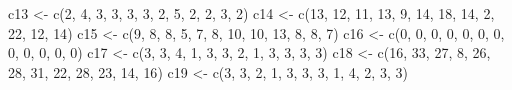 \documentclass[
]{book}
\newenvironment{Shaded}{\begin{snugshade}}{\end{snugshade}}
\newcommand{\DecValTok}[1]{\textcolor[rgb]{0.00,0.00,0.81}{#1}}
\newcommand{\FunctionTok}[1]{\textcolor[rgb]{0.00,0.00,0.00}{#1}}
\newcommand{\NormalTok}[1]{#1}
\newcommand{\OtherTok}[1]{\textcolor[rgb]{0.56,0.35,0.01}{#1}}
\begin{document}
\begin{Shaded}
\begin{Highlighting}[]
\NormalTok{c13 }\OtherTok{\textless{}{-}} \FunctionTok{c}\NormalTok{(}\DecValTok{2}\NormalTok{, }\DecValTok{4}\NormalTok{, }\DecValTok{3}\NormalTok{, }\DecValTok{3}\NormalTok{, }\DecValTok{3}\NormalTok{, }\DecValTok{3}\NormalTok{, }\DecValTok{2}\NormalTok{, }\DecValTok{5}\NormalTok{, }\DecValTok{2}\NormalTok{, }\DecValTok{2}\NormalTok{, }\DecValTok{3}\NormalTok{, }\DecValTok{2}\NormalTok{)}
\NormalTok{c14 }\OtherTok{\textless{}{-}} \FunctionTok{c}\NormalTok{(}\DecValTok{13}\NormalTok{, }\DecValTok{12}\NormalTok{, }\DecValTok{11}\NormalTok{, }\DecValTok{13}\NormalTok{, }\DecValTok{9}\NormalTok{, }\DecValTok{14}\NormalTok{, }\DecValTok{18}\NormalTok{, }\DecValTok{14}\NormalTok{, }\DecValTok{2}\NormalTok{, }\DecValTok{22}\NormalTok{, }\DecValTok{12}\NormalTok{, }\DecValTok{14}\NormalTok{)}
\NormalTok{c15 }\OtherTok{\textless{}{-}} \FunctionTok{c}\NormalTok{(}\DecValTok{9}\NormalTok{, }\DecValTok{8}\NormalTok{, }\DecValTok{8}\NormalTok{, }\DecValTok{5}\NormalTok{, }\DecValTok{7}\NormalTok{, }\DecValTok{8}\NormalTok{, }\DecValTok{10}\NormalTok{, }\DecValTok{10}\NormalTok{, }\DecValTok{13}\NormalTok{, }\DecValTok{8}\NormalTok{, }\DecValTok{8}\NormalTok{, }\DecValTok{7}\NormalTok{)}
\NormalTok{c16 }\OtherTok{\textless{}{-}} \FunctionTok{c}\NormalTok{(}\DecValTok{0}\NormalTok{, }\DecValTok{0}\NormalTok{, }\DecValTok{0}\NormalTok{, }\DecValTok{0}\NormalTok{, }\DecValTok{0}\NormalTok{, }\DecValTok{0}\NormalTok{, }\DecValTok{0}\NormalTok{, }\DecValTok{0}\NormalTok{, }\DecValTok{0}\NormalTok{, }\DecValTok{0}\NormalTok{, }\DecValTok{0}\NormalTok{, }\DecValTok{0}\NormalTok{)}
\NormalTok{c17 }\OtherTok{\textless{}{-}} \FunctionTok{c}\NormalTok{(}\DecValTok{3}\NormalTok{, }\DecValTok{3}\NormalTok{, }\DecValTok{4}\NormalTok{, }\DecValTok{1}\NormalTok{, }\DecValTok{3}\NormalTok{, }\DecValTok{3}\NormalTok{, }\DecValTok{2}\NormalTok{, }\DecValTok{1}\NormalTok{, }\DecValTok{3}\NormalTok{, }\DecValTok{3}\NormalTok{, }\DecValTok{3}\NormalTok{, }\DecValTok{3}\NormalTok{)}
\NormalTok{c18 }\OtherTok{\textless{}{-}} \FunctionTok{c}\NormalTok{(}\DecValTok{16}\NormalTok{, }\DecValTok{33}\NormalTok{, }\DecValTok{27}\NormalTok{, }\DecValTok{8}\NormalTok{, }\DecValTok{26}\NormalTok{, }\DecValTok{28}\NormalTok{, }\DecValTok{31}\NormalTok{, }\DecValTok{22}\NormalTok{, }\DecValTok{28}\NormalTok{, }\DecValTok{23}\NormalTok{, }\DecValTok{14}\NormalTok{, }\DecValTok{16}\NormalTok{)}
\NormalTok{c19 }\OtherTok{\textless{}{-}} \FunctionTok{c}\NormalTok{(}\DecValTok{3}\NormalTok{, }\DecValTok{3}\NormalTok{, }\DecValTok{2}\NormalTok{, }\DecValTok{1}\NormalTok{, }\DecValTok{3}\NormalTok{, }\DecValTok{3}\NormalTok{, }\DecValTok{3}\NormalTok{, }\DecValTok{1}\NormalTok{, }\DecValTok{4}\NormalTok{, }\DecValTok{2}\NormalTok{, }\DecValTok{3}\NormalTok{, }\DecValTok{3}\NormalTok{)}

\end{Highlighting}
\end{Shaded}
\end{document}
